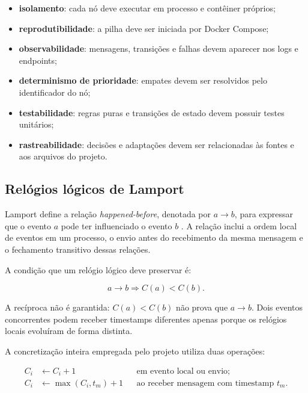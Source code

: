 \begin{itemize}
    \item \textbf{isolamento}: cada nó deve executar em processo e contêiner próprios;
    \item \textbf{reprodutibilidade}: a pilha deve ser iniciada por Docker Compose;
    \item \textbf{observabilidade}: mensagens, transições e falhas devem aparecer nos logs e endpoints;
    \item \textbf{determinismo de prioridade}: empates devem ser resolvidos pelo identificador do nó;
    \item \textbf{testabilidade}: regras puras e transições de estado devem possuir testes unitários;
    \item \textbf{rastreabilidade}: decisões e adaptações devem ser relacionadas às fontes e aos arquivos do projeto.
\end{itemize}

\subsection{Relógios lógicos de Lamport}

Lamport define a relação \emph{happened-before}, denotada por $a \rightarrow b$, para expressar que o evento $a$ pode ter influenciado o evento $b$ \cite{lamport1978}. A relação inclui a ordem local de eventos em um processo, o envio antes do recebimento da mesma mensagem e o fechamento transitivo dessas relações.

A condição que um relógio lógico deve preservar é:

\begin{equation}
    a \rightarrow b \Rightarrow C(a) < C(b).
    \label{eq:clock-condition}
\end{equation}

A recíproca não é garantida: $C(a) < C(b)$ não prova que $a \rightarrow b$. Dois eventos concorrentes podem receber timestamps diferentes apenas porque os relógios locais evoluíram de forma distinta.

A concretização inteira empregada pelo projeto utiliza duas operações:

\begin{align}
    C_i &\leftarrow C_i + 1 && \text{em evento local ou envio;} \\
    C_i &\leftarrow \max(C_i, t_m) + 1 && \text{ao receber mensagem com timestamp } t_m.
\end{align}

